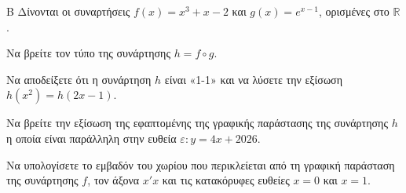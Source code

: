 \begin{thema}{Β}
Δίνονται οι συναρτήσεις $f(x) = x^3 + x - 2$ και $g(x) = e^{x-1}$, ορισμένες στο $\mathbb{R}$.
\begin{erwthma}
\item Να βρείτε τον τύπο της συνάρτησης $h = f \circ g$.
\item Να αποδείξετε ότι η συνάρτηση $h$ είναι «1-1» και να λύσετε την εξίσωση $h(x^2) = h(2x-1)$.
\item Να βρείτε την εξίσωση της εφαπτομένης της γραφικής παράστασης της συνάρτησης $h$ η οποία είναι παράλληλη στην ευθεία $\varepsilon: y = 4x + 2026$.
\item Να υπολογίσετε το εμβαδόν του χωρίου που περικλείεται από τη γραφική παράσταση της συνάρτησης $f$, τον άξονα $x'x$ και τις κατακόρυφες ευθείες $x=0$ και $x=1$.
\end{erwthma}
\end{thema}
